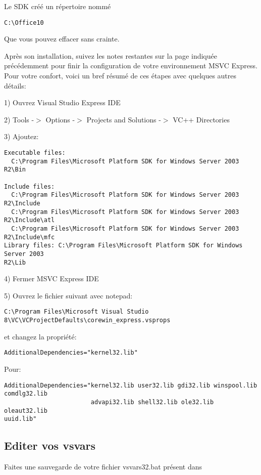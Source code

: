 Le SDK cr\'e\'e un r\'epertoire nomm\'e

\begin{verbatim}
C:\Office10
\end{verbatim}

Que vous pouvez effacer sans crainte.

Apr\`es son installation, suivez les notes restantes sur la page indiqu\'ee pr\'ec\'edemment pour finir la configuration de votre environnement MSVC Express. Pour votre confort, voici un bref r\'esum\'e de ces \'etapes avec quelques autres d\'etails:

1) Ouvrez Visual Studio Express IDE

2) Tools -$>$ Options -$>$ Projects and Solutions -$>$ VC++ Directories

3) Ajoutez:

\begin{verbatim}
Executable files: 
  C:\Program Files\Microsoft Platform SDK for Windows Server 2003 R2\Bin

Include files: 
  C:\Program Files\Microsoft Platform SDK for Windows Server 2003 R2\Include
  C:\Program Files\Microsoft Platform SDK for Windows Server 2003 R2\Include\atl
  C:\Program Files\Microsoft Platform SDK for Windows Server 2003 R2\Include\mfc
Library files: C:\Program Files\Microsoft Platform SDK for Windows Server 2003
R2\Lib
\end{verbatim}

4) Fermer MSVC Express IDE

5) Ouvrez le fichier suivant avec notepad:

\begin{verbatim}
C:\Program Files\Microsoft Visual Studio
8\VC\VCProjectDefaults\corewin_express.vsprops
\end{verbatim}

et changez la propri\'et\'e:

\begin{verbatim}
AdditionalDependencies="kernel32.lib"
\end{verbatim}

Pour:

\begin{verbatim}
AdditionalDependencies="kernel32.lib user32.lib gdi32.lib winspool.lib
comdlg32.lib 
                        advapi32.lib shell32.lib ole32.lib oleaut32.lib
uuid.lib"
\end{verbatim}

\subsection{Editer vos vsvars}
Faites une sauvegarde de votre fichier vsvars32.bat pr\'esent dans


